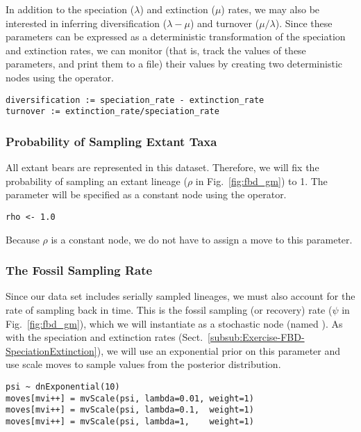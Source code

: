 In addition to the speciation ($\lambda$) and extinction ($\mu$) rates, we may also be interested in inferring diversification ($\lambda - \mu$) and turnover ($\mu/\lambda$).
Since these parameters can be expressed as a deterministic transformation of the speciation and extinction rates, we can monitor (that is, track the values of these parameters, and print them to a file) their values by creating two deterministic nodes using the \cl{:=} operator.
{\tt \begin{snugshade*}
\begin{lstlisting}
diversification := speciation_rate - extinction_rate
turnover := extinction_rate/speciation_rate
\end{lstlisting}
\end{snugshade*}}

\subsubsection{Probability of Sampling Extant Taxa}\label{subsub:Exercise-FBD-Rho}

All extant bears are represented in this dataset. 
Therefore, we will fix the probability of sampling an extant lineage ($\rho$ in Fig.\ \ref{fig:fbd_gm}) to 1.
The parameter  will be specified as a constant node using the \cl{<-} operator.
{\tt \begin{snugshade*}
\begin{lstlisting}
rho <- 1.0
\end{lstlisting}
\end{snugshade*}}
Because $\rho$ is a constant node, we do not have to assign a move to this parameter.

\subsubsection{The Fossil Sampling Rate}\label{subsub:Exercise-FBD-Psi}

Since our data set includes serially sampled lineages, we must also account for the rate of sampling back in time. 
This is the fossil sampling (or recovery) rate ($\psi$ in Fig.\ \ref{fig:fbd_gm}), which we will instantiate as a stochastic node (named ). 
As with the speciation and extinction rates (Sect.\ \ref{subsub:Exercise-FBD-SpeciationExtinction}), we will use an exponential prior on this parameter and use scale moves to sample values from the posterior distribution.
{\tt \begin{snugshade*}
\begin{lstlisting}
psi ~ dnExponential(10) 
moves[mvi++] = mvScale(psi, lambda=0.01, weight=1)
moves[mvi++] = mvScale(psi, lambda=0.1,  weight=1)
moves[mvi++] = mvScale(psi, lambda=1,    weight=1)
\end{lstlisting}
\end{snugshade*}}

